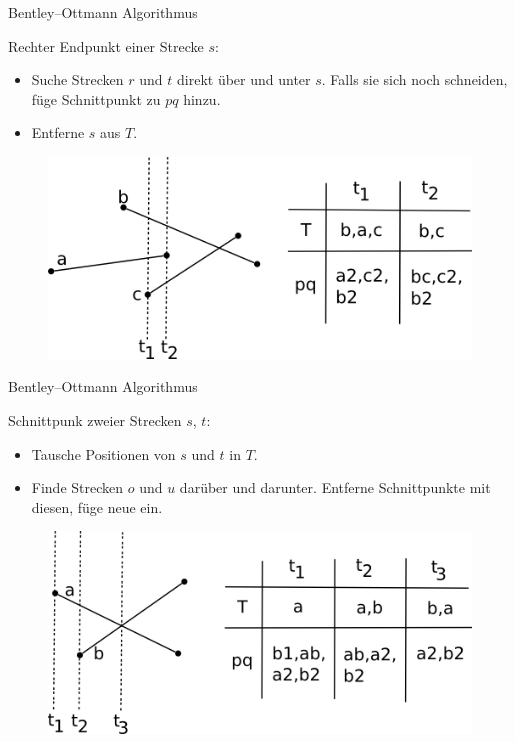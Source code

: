 \documentclass[18pt]{beamer}
\begin{document}
\begin{frame}{Bentley–Ottmann Algorithmus}
	\begin{block}{Rechter Endpunkt einer Strecke $s$:}
		\begin{itemize}
			\item Suche Strecken $r$ und $t$ direkt über und unter $s$. Falls sie sich noch schneiden, füge Schnittpunkt zu $pq$ hinzu.
			\item Entferne $s$ aus $T$.
		\end{itemize}
	\end{block}
	\begin{figure}
		\includegraphics[scale=0.8]{logos/remove.png}\\
	\end{figure}
\end{frame}

\begin{frame}{Bentley–Ottmann Algorithmus}
	\begin{block}{Schnittpunk zweier Strecken $s$, $t$:}
		\begin{itemize}
			\item Tausche Positionen von $s$ und $t$ in $T$.
			\item Finde Strecken $o$ und $u$ darüber und darunter. Entferne Schnittpunkte mit diesen, füge neue ein.
		\end{itemize}
	\end{block}
	\begin{figure}
		\includegraphics[scale=0.8]{logos/intersect.png}\\
	\end{figure}
\end{frame}
\end{document}
